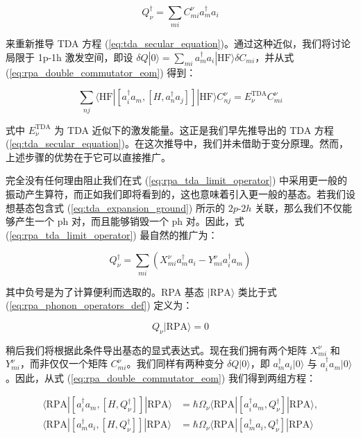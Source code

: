 \begin{equation}
Q^{\dagger}_{\nu}=\sum_{mi}C^{\nu}_{mi}a^{\dagger}_{m}a_{i}\label{eq:rpa_tda_limit_operator}
\end{equation}

来重新推导 TDA 方程 (\ref{eq:tda_secular_equation})。通过这种近似，我们将讨论局限于 1p-1h
激发空间，即设 $\delta Q|0\rangle=\sum_{mi}a^{\dagger}_{m}a_{i}|\text{HF}\rangle\delta C_{mi}$，并从式
(\ref{eq:rpa_double_commutator_eom}) 得到：

\begin{equation}
\sum_{nj}\langle\text{HF}|[a^{\dagger}_{i}a_{m},[H,a^{\dagger}_{n}a_{j}]]|\text{HF}\rangle C^{\nu}_{nj}=E^{\text{TDA}}_{\nu}C^{\nu}_{mi}\label{eq:rpa_rederive_tda}
\end{equation}

式中 $E^{\text{TDA}}_{\nu}$ 为 TDA 近似下的激发能量。这正是我们早先推导出的 TDA 方程 (\ref{eq:tda_secular_equation})。在这次推导中，我们并未借助于变分原理。然而，上述步骤的优势在于它可以直接推广。

完全没有任何理由阻止我们在式 (\ref{eq:rpa_tda_limit_operator}) 中采用更一般的振动产生算符，而正如我们即将看到的，这也意味着引入更一般的基态。若我们设想基态包含式
(\ref{eq:tda_expansion_ground}) 所示的 $2p\text{-}2h$ 关联，那么我们不仅能够产生一个
ph 对，而且能够销毁一个 ph 对。因此，式 (\ref{eq:rpa_tda_limit_operator}) 最自然的推广为：

\begin{equation}
Q^{\dagger}_{\nu}=\sum_{mi}\left(X^{\nu}_{mi}a^{\dagger}_{m}a_{i}-Y^{\nu}_{mi}a^{\dagger}_{i}a_{m}\right)\label{eq:rpa_creation_operator}
\end{equation}

其中负号是为了计算便利而选取的。RPA 基态 $|\text{RPA}\rangle$ 类比于式 (\ref{eq:rpa_phonon_operators_def})
定义为：

\begin{equation}
Q_{\nu}|\text{RPA}\rangle=0\label{eq:rpa_vacuum_condition}
\end{equation}

稍后我们将根据此条件导出基态的显式表达式。现在我们拥有两个矩阵 $X^{\nu}_{mi}$ 和 $Y^{\nu}_{mi}$，而非仅仅一个矩阵
$C^{\nu}_{mi}$。我们同样有两种变分 $\delta Q|0\rangle$，即 $a^{\dagger}_{m}a_{i}|0\rangle$
与 $a^{\dagger}_{i}a_{m}|0\rangle$。因此，从式 (\ref{eq:rpa_double_commutator_eom})
我们得到两组方程：

\begin{align}
\langle\text{RPA}|[a^{\dagger}_{i}a_{m},[H,Q^{\dagger}_{\nu}]]|\text{RPA}\rangle & =\hbar\Omega_{\nu}\langle\text{RPA}|[a^{\dagger}_{i}a_{m},Q^{\dagger}_{\nu}]|\text{RPA}\rangle,\nonumber \\
\langle\text{RPA}|[a^{\dagger}_{m}a_{i},[H,Q^{\dagger}_{\nu}]]|\text{RPA}\rangle & =\hbar\Omega_{\nu}\langle\text{RPA}|[a^{\dagger}_{m}a_{i},Q^{\dagger}_{\nu}]|\text{RPA}\rangle\label{eq:rpa_general_eom_pair}
\end{align}

